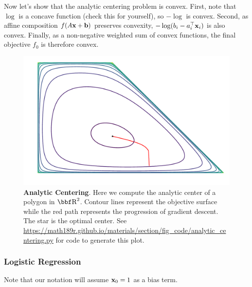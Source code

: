 \documentclass{article}
\begin{document}
Now let's show that the analytic centering problem is convex. First, note
that $\log$ is a concave function (check this for yourself), so $-\log$ is
convex. Second, as affine composition $f(A{\bf x} + {\bf b})$ preserves convexity,
$-\log(b_i - a_i^\top{\bf x}_i)$ is also convex. Finally, as a non-negative weighted
sum of convex functions, the final objective $f_0$ is therefore convex.

\begin{figure}
    \centering
    \includegraphics[width=0.6\linewidth]{fig/analytic_centering.pdf}
    \caption{\textbf{Analytic Centering}. Here we compute the analytic center
    of a polygon in $\RR^2$. Contour lines represent the objective surface
    while the red path represents the progression of gradient descent. The
    star is the optimal center. See \url{https://math189r.github.io/materials/section/fig_code/analytic_centering.py}
    for code to generate this plot.}
    \label{fig:analytic-center}
\end{figure}


\subsubsection{Logistic Regression}

Note that our notation will assume ${\bf x}_0=1$ as a bias term.\\
\end{document}
